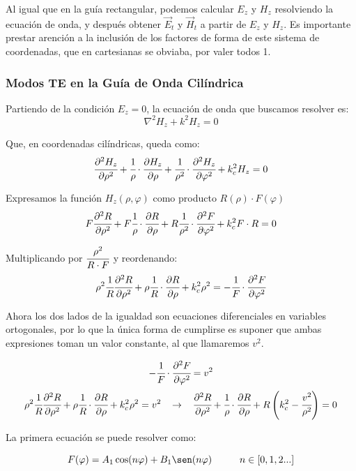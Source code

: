 \documentclass[12pt]{article}
\begin{document}
Al igual que en la gu\'ia rectangular, podemos calcular $E_z$ y $H_z$ resolviendo la ecuaci\'on de onda, y despu\'es obtener $\vec{E}_t$ y $\vec{H}_t$ a partir de $E_z$ y $H_z$. Es importante prestar arenci\'on a la inclusi\'on de los factores de forma de este sistema de coordenadas, que en cartesianas se obviaba, por valer todos 1.

\subsubsection{Modos TE en la Gu\'ia de Onda Cil\'indrica}

Partiendo de la condici\'on $E_z = 0$, la ecuaci\'on de onda que buscamos resolver es:
$$\nabla^2 H_z + k^2 H_z =0$$

Que, en coordenadas cil\'indricas, queda como:
$$\cfrac{\partial^2 H_z}{\partial \rho^2} +\cfrac{1}{\rho}\cdot\cfrac{\partial H_z}{\partial \rho}+\cfrac{1}{\rho^2} \cdot\cfrac{\partial^2 H_z}{\partial \varphi^2} + k^2_c H_z = 0$$

Expresamos la funci\'on $H_z(\rho, \varphi)$ como producto $R(\rho)\cdot F(\varphi)$
$$F\cfrac{\partial^2 R}{\partial \rho^2} +F\cfrac{1}{\rho}\cdot\cfrac{\partial R}{\partial \rho}+R\cfrac{1}{\rho^2} \cdot\cfrac{\partial^2 F}{\partial \varphi^2} + k^2_c F\cdot R = 0$$

Multiplicando por $\cfrac{\rho^2}{R\cdot F}$ y reordenando:
$$\rho^2\cfrac{1}{R}\cfrac{\partial^2 R}{\partial \rho^2} +\rho\cfrac{1}{R}\cdot\cfrac{\partial R}{\partial \rho} + k^2_c \rho^2 = -\cfrac{1}{F} \cdot\cfrac{\partial^2 F}{\partial \varphi^2}$$

Ahora los dos lados de la igualdad son ecuaciones diferenciales en variables ortogonales, por lo que la \'unica forma de cumplirse es suponer que ambas expresiones toman un valor constante, al que llamaremos $v^2$.

$$-\cfrac{1}{F} \cdot\cfrac{\partial^2 F}{\partial \varphi^2} = v^2$$
$$\rho^2\cfrac{1}{R}\cfrac{\partial^2 R}{\partial \rho^2} +\rho\cfrac{1}{R}\cdot\cfrac{\partial R}{\partial \rho} + k^2_c \rho^2 = v^2 \hspace{0.3cm}\rightarrow \hspace{0.3cm} \cfrac{\partial^2 R}{\partial \rho^2} +\cfrac{1}{\rho}\cdot\cfrac{\partial R}{\partial \rho} + R\left( k^2_c  - \cfrac{v^2}{\rho^2}\right) = 0$$

La primera ecuaci\'on se puede resolver como:

$$F(\varphi) = A_1\cos(n\varphi) +B_1\sen(n\varphi) \hspace{1cm} n \in [0,1,2...]$$
\end{document}
